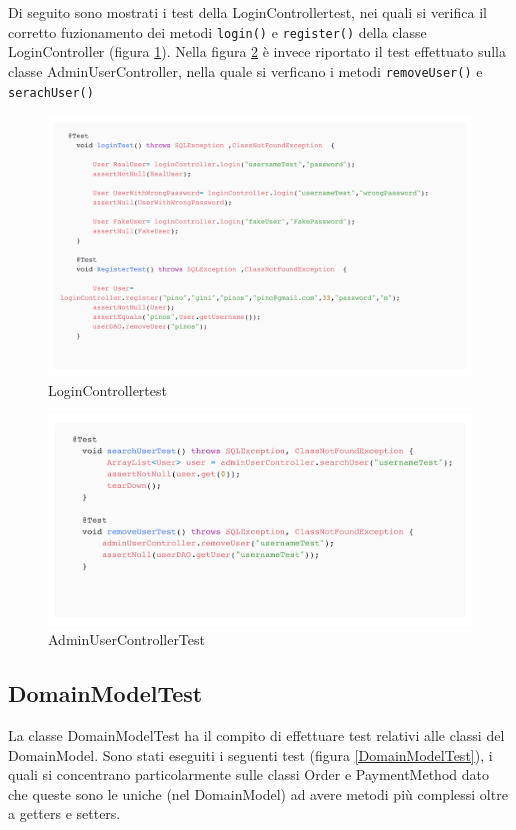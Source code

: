 \documentclass{article}
\begin{document}
Di seguito sono mostrati i test della LoginControllertest, nei quali
si verifica il corretto fuzionamento dei metodi \texttt{login()} e \texttt{register()} della classe LoginController (figura \ref{LoginControllertest}). Nella  figura \ref{AdminUserControllerTest} è invece riportato il test effettuato sulla classe AdminUserController, nella quale si verficano i metodi \texttt{removeUser()} e \texttt{serachUser()}


\begin{figure}[!h]
    \centering
    \includegraphics[width=1.0\linewidth]{imgs/snippets/testLogin.png}
    \caption{LoginControllertest}
    \label{LoginControllertest}
\end{figure}


\begin{figure}[!h]
    \centering
    \includegraphics[width=1.0\linewidth]{imgs/snippets/AdminUserControllerTest.png}
    \caption{AdminUserControllerTest}
    \label{AdminUserControllerTest}
\end{figure}

\newpage


\subsection{DomainModelTest}
La classe DomainModelTest ha il compito di effettuare test relativi alle classi del DomainModel. Sono stati eseguiti i seguenti test (figura \ref{DomainModelTest}), i quali si concentrano particolarmente sulle classi Order e PaymentMethod dato che queste sono le uniche (nel DomainModel) ad avere metodi più complessi oltre a getters e setters.
\end{document}
